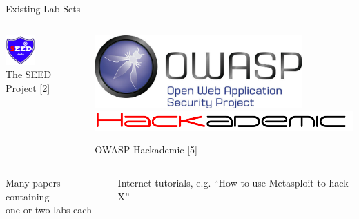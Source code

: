 \documentclass{beamer}
\begin{document}
	\begin{frame}{Existing Lab Sets}
		\begin{columns}
             		\begin{column}{0.5\textwidth}
				\begin{center}
					\includegraphics[width=0.4\textwidth]{seed-labs-logo.png} \\
	                			The SEED Project [2]
				\end{center}
              		\end{column}
			\pause		
            		\begin{column}{0.5\textwidth}			
				\begin{center}
					\includegraphics[width=0.8\textwidth]{owasp-logo.jpg} \\
					\includegraphics[width=\textwidth]{hackademic-logo.png}
					
					OWASP Hackademic [5]
				\end{center}
              		\end{column}
		\end{columns}			
		\vfill
		\begin{columns}
            		\begin{column}{0.5\textwidth}
            		\pause	
			\begin{center}	
			Many papers containing\\one or two labs each
			\end{center}
             		\end{column}
			\pause
            		\begin{column}{0.5\textwidth}				
			\begin{center}
			Internet tutorials, e.g. ``How to use Metasploit to hack X''
			\end{center}
              		\end{column}
		\end{columns}	
	\end{frame}
	
\end{document}
